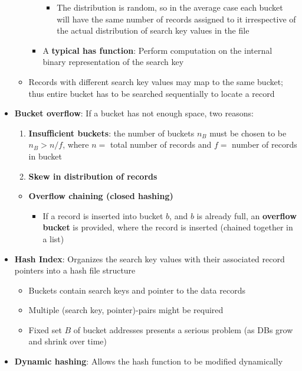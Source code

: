 \begin{itemize}[label=\(\rhd\)]
\begin{itemize}[label=\(\rhd\)]
\begin{itemize}[label=\(\rhd\)]
\begin{itemize}[label=\(\rhd\)]
    \item The distribution is random, so in the average case each bucket will have the same number of records assigned to it irrespective of the actual distribution of search key values in the file 
\end{itemize}
    \item A \textbf{typical has function}: Perform computation on the internal binary representation of the search key
        \end{itemize}
        \item Records with different search key values may map to the same bucket; thus entire bucket has to be searched sequentially to locate a record
    \end{itemize}
    \item \textbf{Bucket overflow}: If a bucket has not enough space, two reasons:
    \begin{enumerate}
        \item \textbf{Insufficient buckets}: the number of buckets $n_B$ must be chosen to be $n_B> n/f$, where $n=$ total number of records and $f=$ number of records in bucket
        \item \textbf{Skew in distribution of records}
    \end{enumerate}
    \begin{itemize}[label=\(\rhd\)]
        \item \textbf{Overflow chaining (closed hashing)}
        \begin{itemize}[label=\(\rhd\)]
            \item If a record is inserted into bucket $b$, and $b$ is already full, an \textbf{overflow bucket} is provided, where the record is inserted (chained together in a list)
        \end{itemize}
    \end{itemize}
    \item \textbf{Hash Index}: Organizes the search key values with their associated record pointers into a hash file structure
    \begin{itemize}[label=\(\rhd\)]
        \item Buckets contain search keys and pointer to the data records
        \item Multiple (search key, pointer)-pairs might be required
    \item Fixed set $B$ of bucket addresses presents a serious problem (as DBs grow and shrink over time)
    \end{itemize}
    \item \textbf{Dynamic hashing}: Allows the hash function to be modified dynamically

\end{itemize}
